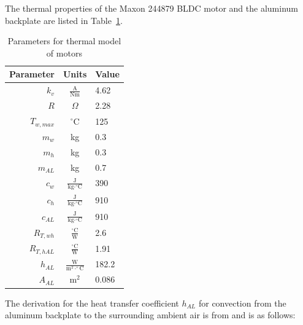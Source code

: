\documentclass{report}
\begin{document}
The thermal properties of the Maxon 244879 BLDC motor and the aluminum backplate are listed in Table~\ref{table:thermalParams}.

\begin{table}[H]
\begin{center}
  \begin{tabular}{ r | c | l }
  	Parameter & Units & Value \\ \hline
    $k_{v}$ & $\frac{\text{A}}{\text{Nm}}$ &  4.62 \\[5pt]
    $R$ & $\Omega$ & 2.28 \\[5pt]
    $T_{w,max}$ & $^{\circ}\text{C}$ & 125 \\[5pt]
    $m_{w}$ & kg & 0.3 \\[5pt]
    $m_{h}$ & kg & 0.3 \\[5pt]
    $m_{AL}$ & kg & 0.7 \\[5pt]
    $c_{w}$ & $\frac{\text{J}}{\text{kg}\cdot^{\circ}\text{C}}$ & 390 \\[5pt]
    $c_{h}$ & $\frac{\text{J}}{\text{kg}\cdot^{\circ}\text{C}}$ & 910 \\[5pt]
    $c_{AL}$ & $\frac{\text{J}}{\text{kg}\cdot^{\circ}\text{C}}$ & 910 \\[5pt]
    $R_{T,wh}$ & $\frac{^{\circ}\text{C}}{\text{W}}$ & 2.6 \\[5pt]
    $R_{T,hAL}$ & $\frac{^{\circ}\text{C}}{\text{W}}$ & 1.91 \\[5pt]
    $h_{AL}$ & $\frac{\text{W}}{\text{m}^{2}\cdot^{\circ}\text{C}}$ & 182.2\\[5pt]
    $A_{AL}$ & $\text{m}^2$ & 0.086
  \end{tabular}
\end{center}
\caption[Parameters for thermal model of motors]{Parameters for thermal model of motors}\label{table:thermalParams}
\end{table}

The derivation for the heat transfer coefficient $h_{AL}$ for convection from the aluminum backplate to the surrounding ambient air is from \cite{Incropera:2006:FHM:1209497} and is as follows:
\end{document}
